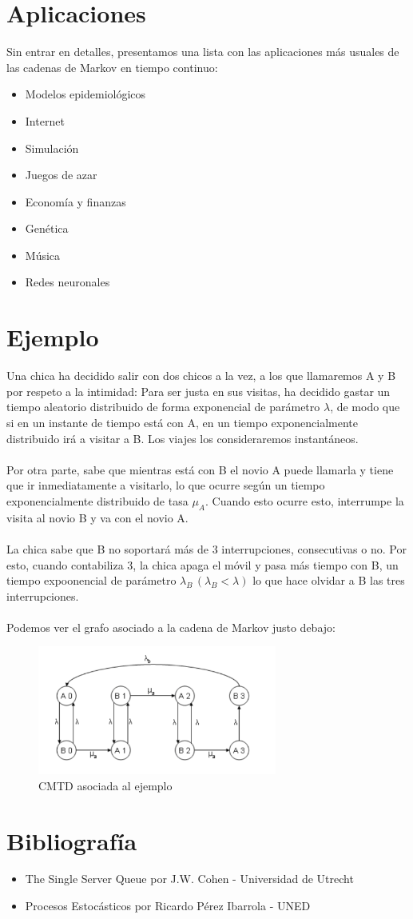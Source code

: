 \documentclass[12pt,a4paper]{article}
\begin{document}
\section{Aplicaciones}
Sin entrar en detalles, presentamos una lista con las aplicaciones más usuales de las cadenas de Markov en tiempo continuo:
\begin{itemize}
\item Modelos epidemiológicos
\item Internet
\item Simulación
\item Juegos de azar
\item Economía y finanzas
\item Genética
\item Música
\item Redes neuronales
\end{itemize}
\section{Ejemplo}
Una chica ha decidido salir con dos chicos a la vez, a los que llamaremos A y B por respeto a la intimidad: Para ser justa en sus visitas, ha decidido gastar un tiempo aleatorio distribuido de forma exponencial de parámetro $\lambda$, de modo que si en un instante de tiempo está con A, en un tiempo exponencialmente distribuido irá a visitar a B. Los viajes los consideraremos instantáneos. 
\\\\
Por otra parte, sabe que mientras está con B el novio A puede llamarla y tiene que ir inmediatamente a visitarlo, lo que ocurre según un tiempo exponencialmente distribuido de tasa $\mu_A$. Cuando esto ocurre esto, interrumpe la visita al novio B y va con el novio A.
\\\\
La chica sabe que B no soportará más de 3 interrupciones, consecutivas o no. Por esto, cuando contabiliza 3, la chica apaga el móvil y pasa más tiempo con B, un tiempo expoonencial de parámetro $\lambda_B\, (\lambda_B <\lambda)$ lo que hace olvidar a B las tres interrupciones.
\\\\
Podemos ver el grafo asociado a la cadena de Markov justo debajo:
\begin{figure}[h]
  \centering
    \includegraphics[width=0.7\textwidth]{img/ejemplo.png}
  \caption{CMTD asociada al ejemplo}
  \label{fig:ejemplo}
\end{figure}
\section{Bibliografía}
\begin{itemize}
	\item The Single Server Queue por J.W. Cohen - Universidad de Utrecht
	\item Procesos Estocásticos por Ricardo Pérez Ibarrola - UNED
\end{itemize}
\end{document}
